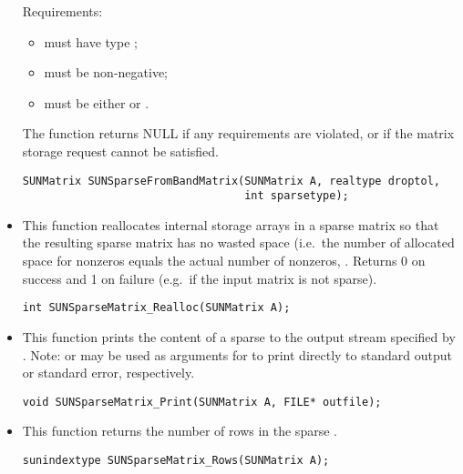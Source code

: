 \begin{itemize}
  Requirements:
  \begin{itemize}
  \item {} must have type ;
  \item {} must be non-negative;
  \item {} must be either  or .
  \end{itemize}
  The function returns NULL if any requirements are violated, or if
  the matrix storage request cannot be satisfied. 

  \begin{verbatim}
SUNMatrix SUNSparseFromBandMatrix(SUNMatrix A, realtype droptol,
                                  int sparsetype);
  \end{verbatim}


\item {}

  This function reallocates internal storage arrays in a sparse matrix
  so that the resulting sparse matrix has no wasted space (i.e.~the
  number of allocated space for nonzeros equals the actual number of
  nonzeros, .  Returns 0 on success and 
  1 on failure (e.g.~if the input matrix is not sparse).

  \verb|int SUNSparseMatrix_Realloc(SUNMatrix A);|


\item {}

  This function prints the content of a sparse  to the
  output stream specified by .  Note: 
  or  may be used as arguments for  to print
  directly to standard output or standard error, respectively.
 
  \verb|void SUNSparseMatrix_Print(SUNMatrix A, FILE* outfile);|


\item {}

  This function returns the number of rows in the sparse .
 
  \verb|sunindextype SUNSparseMatrix_Rows(SUNMatrix A);|



\end{itemize}
